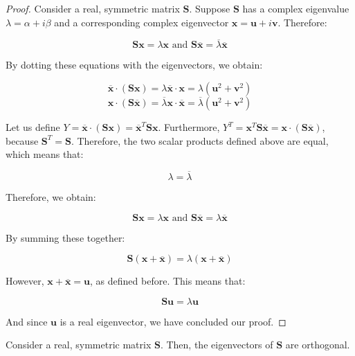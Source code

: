 \documentclass[12pt]{article}
\begin{document}
\begin{proof}
    Consider a real, symmetric matrix $\mathbf{S}$. Suppose $\mathbf{S}$ has a complex eigenvalue $\lambda = \alpha + i\beta$ and a corresponding complex eigenvector $\mathbf{x} = \mathbf{u} + i\mathbf{v}$. Therefore:

    \[ \mathbf{Sx} = \lambda\mathbf{x} \text{   and   } \mathbf{S\overline{x}} = \overline{\lambda}\mathbf{\overline{x}} \]

    By dotting these equations with the eigenvectors, we obtain:

    \[ \overline{\mathbf{x}} \cdot \mathbf{(Sx)} = \lambda\overline{\mathbf{x}}\cdot\mathbf{x} = \lambda(\mathbf{u}^2 +\mathbf{v}^2)\]
    \[ \mathbf{x}\cdot(\mathbf{S}\overline{\mathbf{x}}) = \overline{\lambda}\mathbf{x}\cdot\mathbf{\overline{x}} = \overline{\lambda}(\mathbf{u}^2 + \mathbf{v}^2) \]

    Let us define $Y = \overline{\mathbf{x}}\cdot(\mathbf{Sx}) = \overline{\mathbf{x}}^T\mathbf{Sx}$. Furthermore, $Y^T = \mathbf{x}^T\mathbf{S\overline{x}} = \mathbf{x} \cdot (\mathbf{S\overline{x}})$, because $\mathbf{S}^T = \mathbf{S}$. Therefore, the two scalar products defined above are equal, which means that:

    \[ \lambda = \overline{\lambda} \]

    Therefore, we obtain:

    \[ \mathbf{Sx} = \lambda\mathbf{x} \text{   and   } \mathbf{S\overline{x}} = \lambda\mathbf{\overline{x}} \]

    By summing these together:

    \[ \mathbf{S(\mathbf{x} + \overline{\mathbf{x}})} = \lambda(\mathbf{x} + \overline{\mathbf{x}}) \]

    However, $\mathbf{x} + \overline{\mathbf{x}} = \mathbf{u}$, as defined before. This means that:

    \[ \mathbf{Su} = \lambda\mathbf{u} \]

    And since $\mathbf{u}$ is a real eigenvector, we have concluded our proof.
\end{proof} 

\begin{theorem}
    Consider a real, symmetric matrix $\mathbf{S}$. Then, the eigenvectors of $\mathbf{S}$ are orthogonal.
\end{theorem}
\end{document}
